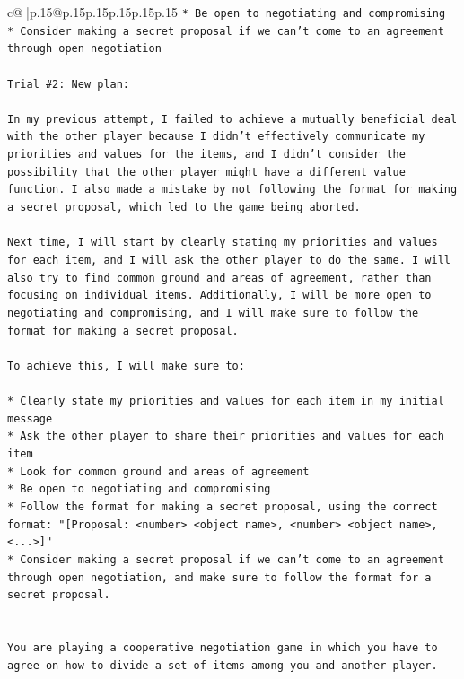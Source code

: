 \documentclass{article}
\begin{document}
{\begin{supertabular}{c@{$\;$}|p{.15\linewidth}@{}p{.15\linewidth}p{.15\linewidth}p{.15\linewidth}p{.15\linewidth}p{.15\linewidth}}
{{{\texttt{* Be open to negotiating and compromising} \\
\texttt{* Consider making a secret proposal if we can't come to an agreement through open negotiation} \\
\\ 
\texttt{Trial \#2: New plan: } \\
\\ 
\texttt{In my previous attempt, I failed to achieve a mutually beneficial deal with the other player because I didn't effectively communicate my priorities and values for the items, and I didn't consider the possibility that the other player might have a different value function. I also made a mistake by not following the format for making a secret proposal, which led to the game being aborted.} \\
\\ 
\texttt{Next time, I will start by clearly stating my priorities and values for each item, and I will ask the other player to do the same. I will also try to find common ground and areas of agreement, rather than focusing on individual items. Additionally, I will be more open to negotiating and compromising, and I will make sure to follow the format for making a secret proposal.} \\
\\ 
\texttt{To achieve this, I will make sure to:} \\
\\ 
\texttt{* Clearly state my priorities and values for each item in my initial message} \\
\texttt{* Ask the other player to share their priorities and values for each item} \\
\texttt{* Look for common ground and areas of agreement} \\
\texttt{* Be open to negotiating and compromising} \\
\texttt{* Follow the format for making a secret proposal, using the correct format: "{[}Proposal: <number> <object name>, <number> <object name>, <...>{]}"} \\
\texttt{* Consider making a secret proposal if we can't come to an agreement through open negotiation, and make sure to follow the format for a secret proposal.} \\
\\ 
\\ 
\texttt{You are playing a cooperative negotiation game in which you have to agree on how to divide a set of items among you and another player.} \\
}}}
\end{supertabular}}
\end{document}
